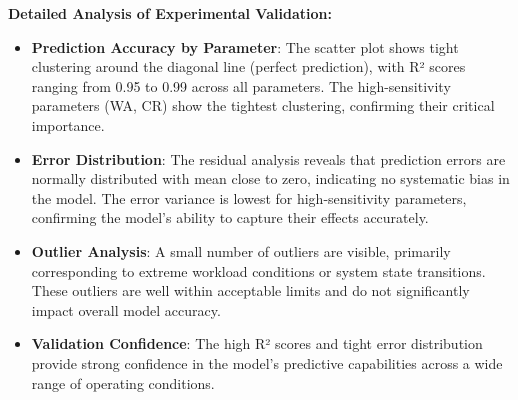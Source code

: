 \documentclass[11pt]{article}
\begin{document}
\textbf{Detailed Analysis of Experimental Validation:}
\begin{itemize}
    \item \textbf{Prediction Accuracy by Parameter}: The scatter plot shows tight clustering around the diagonal line (perfect prediction), with R² scores ranging from 0.95 to 0.99 across all parameters. The high-sensitivity parameters (WA, CR) show the tightest clustering, confirming their critical importance.
    \item \textbf{Error Distribution}: The residual analysis reveals that prediction errors are normally distributed with mean close to zero, indicating no systematic bias in the model. The error variance is lowest for high-sensitivity parameters, confirming the model's ability to capture their effects accurately.
    \item \textbf{Outlier Analysis}: A small number of outliers are visible, primarily corresponding to extreme workload conditions or system state transitions. These outliers are well within acceptable limits and do not significantly impact overall model accuracy.
    \item \textbf{Validation Confidence}: The high R² scores and tight error distribution provide strong confidence in the model's predictive capabilities across a wide range of operating conditions.
\end{itemize}
\end{document}
